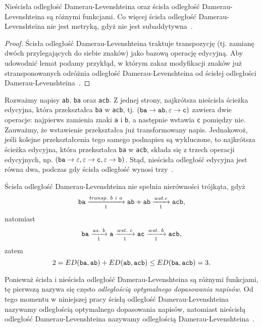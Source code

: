 \documentclass{praca1}
\begin{document}
\begin{lemma}
Nieścisła odległość Damerau-Levenshteina oraz ścisła odległość Damerau-Levenshteina są różnymi funkcjami. Co więcej ścisła odległość Damerau-Levenshteina nie jest metryką, gdyż nie jest subaddytywna~\cite{Boytsov2011:indexingmethods}.
\end{lemma}

\begin{proof}
Ścisła odległość Damerau-Levenshteina traktuje transpozycję (tj. zamianę dwóch przylegających do siebie znaków) jako bazową operację edycyjną. Aby udowodnić lemat podamy przykłąd, w którym zakaz modyfikacji znaków już stransponowanych odróżnia odległość Damerau-Levenshteina od ścisłej odległości Damerau-Levenshteina~\cite{Boytsov2011:indexingmethods}.
\end{proof}

Rozważmy napisy \verb|ab|, \verb|ba| oraz \verb|acb|. Z jednej strony, najkrótsza nieścisła ścieżka edycyjna, która przekształca \verb|ba| w \verb|acb|, tj. $(\verb|ba| \rightarrow \verb|ab|, \varepsilon \rightarrow \verb|c|)$ zawiera dwie operacje: najpierws zamienia znaki \verb|a| i \verb|b|, a następnie wstawia \verb|c| pomiędzy nie. Zauważmy, że wstawienie przekształca już transformowany napis. Jednakowoż, jeśli kolejne przekształcenia tego samego podnapisu są wykluczone, to najkrótsza ścieżka edycyjna, która przekształca \verb|ba| w \verb|acb|, składa się z trzech operacji edycyjnych, np. $(\verb|ba| \rightarrow \varepsilon, \varepsilon \rightarrow \verb|c|, \varepsilon \rightarrow \verb|b|)$. Stąd, nieścisła odległość edycyjna jest równa dwa, podczas gdy ścisła odległość wynosi trzy~\cite{Boytsov2011:indexingmethods}. 

Ścisła odległość Damerau-Levenshteina nie spełnia nierówności trójkąta, gdyż
$$
\verb|ba|  \xrightarrow[1]{transp.\ b\ i \ a} \verb|ab| + \verb|ab| \xrightarrow[1]{wst. c} \verb|acb|,
$$
natomiast
$$
\verb|ba|  \xrightarrow[1]{us.\ b} \verb|a| \xrightarrow[1]{wst.\ c} \verb|ac| \xrightarrow[1]{wst.\ b} \verb|acb|,
$$
zatem
$$
2 = ED(\verb|ba|, \verb|ab|) + ED(\verb|ab|, \verb|acb|) \leq ED(\verb|ba|, \verb|acb|) = 3.
$$

Ponieważ ścisła i nieścisła odległość Damerau-Levenshteina są różnymi funkcjami, tę pierwszą nazywa się często \emph{odległością optymalnego dopasowania napisów}. Od tego momentu w niniejszej pracy ścisłą odległość Damerau-Levenshteina nazywamy odległością optymalnego dopasowania napisów, natomiast nieścisłą odległość Damerau-Levenshteina nazywamy odległością Damerau-Levenshteina~\cite{Loo2014:stringdist}.
\end{document}
